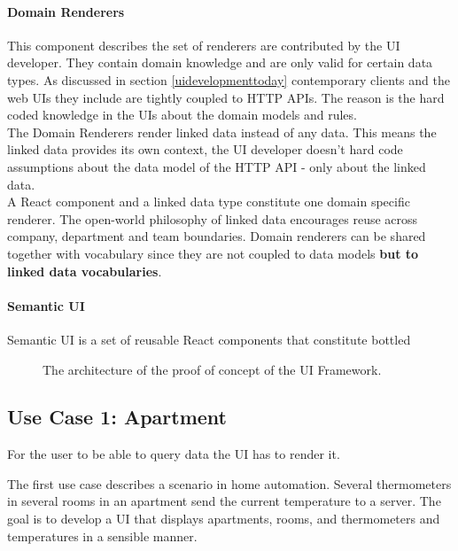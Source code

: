 \paragraph{Domain Renderers}
This component describes the set of renderers are contributed by the UI developer. They contain domain knowledge and are only valid for certain data types. As discussed in section \ref{uidevelopmenttoday} contemporary clients and the web UIs they include are tightly coupled to HTTP APIs. The reason is the hard coded knowledge in the UIs about the domain models and rules. \\
The Domain Renderers render linked data instead of any data. This means the linked data provides its own context, the UI developer doesn't hard code assumptions about the data model of the HTTP API - only about the linked data. \\
A React component and a linked data type constitute one domain specific renderer. The open-world philosophy of linked data encourages reuse across company, department and team boundaries. Domain renderers can be shared together with vocabulary since they are not coupled to data models \textbf{but to linked data vocabularies}.

\paragraph{Semantic UI}
Semantic UI is a set of reusable React components that constitute bottled

\begin{figure}[!htb]
  \caption{The architecture of the proof of concept of the UI Framework.}
\end{figure}

\subsection{Use Case 1: Apartment}
For the user to be able to query data the UI has to render it.

The first use case describes a scenario in home automation. Several thermometers in several rooms in an apartment send the current temperature to a server. The goal is to develop a UI that displays apartments, rooms, and thermometers and temperatures in a sensible manner.

